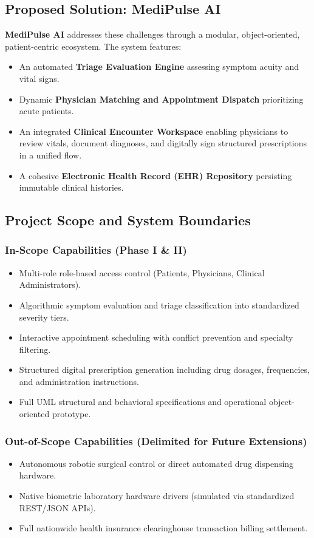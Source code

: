 \documentclass[11pt,a4paper]{article}
\begin{document}
\subsection{Proposed Solution: MediPulse AI}
\textbf{MediPulse AI} addresses these challenges through a modular, object-oriented, patient-centric ecosystem. The system features:
\begin{itemize}
    \item An automated \textbf{Triage Evaluation Engine} assessing symptom acuity and vital signs.
    \item Dynamic \textbf{Physician Matching and Appointment Dispatch} prioritizing acute patients.
    \item An integrated \textbf{Clinical Encounter Workspace} enabling physicians to review vitals, document diagnoses, and digitally sign structured prescriptions in a unified flow.
    \item A cohesive \textbf{Electronic Health Record (EHR) Repository} persisting immutable clinical histories.
\end{itemize}

\subsection{Project Scope and System Boundaries}
\subsubsection{In-Scope Capabilities (Phase I \& II)}
\begin{itemize}
    \item Multi-role role-based access control (Patients, Physicians, Clinical Administrators).
    \item Algorithmic symptom evaluation and triage classification into standardized severity tiers.
    \item Interactive appointment scheduling with conflict prevention and specialty filtering.
    \item Structured digital prescription generation including drug dosages, frequencies, and administration instructions.
    \item Full UML structural and behavioral specifications and operational object-oriented prototype.
\end{itemize}

\subsubsection{Out-of-Scope Capabilities (Delimited for Future Extensions)}
\begin{itemize}
    \item Autonomous robotic surgical control or direct automated drug dispensing hardware.
    \item Native biometric laboratory hardware drivers (simulated via standardized REST/JSON APIs).
    \item Full nationwide health insurance clearinghouse transaction billing settlement.
\end{itemize}
\end{document}
